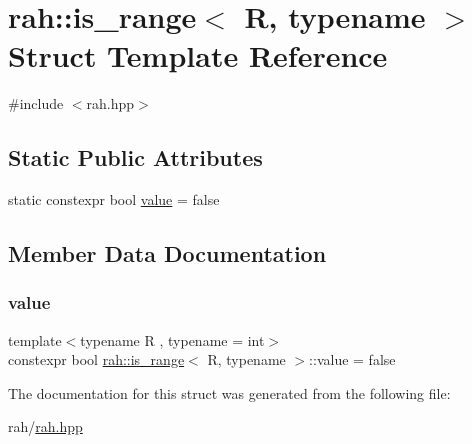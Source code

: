 \hypertarget{structrah_1_1is__range}{}\section{rah\+::is\+\_\+range$<$ R, typename $>$ Struct Template Reference}
\label{structrah_1_1is__range}


{\ttfamily \#include $<$rah.\+hpp$>$}

\subsection*{Static Public Attributes}
\begin{DoxyCompactItemize}
\item 
static constexpr bool \mbox{\hyperlink{structrah_1_1is__range_aba3dcd2689e3482f2d6f267694c48f00}{value}} = false
\end{DoxyCompactItemize}


\subsection{Member Data Documentation}
\mbox{\label{structrah_1_1is__range_aba3dcd2689e3482f2d6f267694c48f00}} 
\subsubsection{\texorpdfstring{value}{value}}
{\footnotesize\ttfamily template$<$typename R , typename  = int$>$ \\
constexpr bool \mbox{\hyperlink{structrah_1_1is__range}{rah\+::is\+\_\+range}}$<$ R, typename $>$\+::value = false\hspace{0.3cm}{\ttfamily [static]}}



The documentation for this struct was generated from the following file\+:\begin{DoxyCompactItemize}
\item 
rah/\mbox{\hyperlink{rah_8hpp}{rah.\+hpp}}\end{DoxyCompactItemize}
